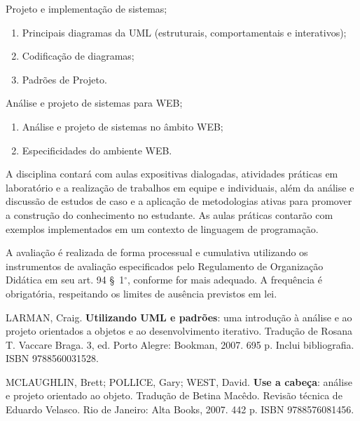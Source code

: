 \begin{pud}
\begin{description}[itemsep=0em]
		\item[UNIDADE III:] Projeto e implementação de sistemas; 
	         \begin{enumerate}[itemsep=0em, topsep=0em]
				\item Principais diagramas da UML (estruturais, comportamentais  e interativos);
				\item Codificação de diagramas;
				\item Padrões de Projeto.
            \end{enumerate}
            
        \item[UNIDADE IV:] Análise e projeto de sistemas para WEB;
	         \begin{enumerate}[itemsep=0em, topsep=0em]
				\item Análise e projeto de sistemas no âmbito WEB;
				\item Especificidades do ambiente WEB.
            \end{enumerate}

                                    

	\end{description}
	
	
	\metodologia
	A disciplina contará com aulas expositivas dialogadas, atividades práticas em laboratório e a realização de trabalhos em equipe e individuais, além da análise e discussão de estudos de caso e a aplicação de metodologias ativas para promover a construção do conhecimento no estudante. As aulas práticas contarão com exemplos implementados em um contexto de linguagem de programação.
	
	\avaliacao
	A avaliação é realizada de forma processual e cumulativa utilizando os instrumentos de avaliação especificados pelo Regulamento de Organização Didática em seu art. 94 \S~1$^\circ$, conforme for mais adequado. A frequência é obrigatória, respeitando os limites de ausência previstos em lei.
	\naopresencial
	
	
	\begin{bibbasica}
		 \item LARMAN, Craig. \textbf{Utilizando UML e padrões}: uma introdução à análise e ao projeto orientados a objetos e ao desenvolvimento iterativo. Tradução de Rosana T. Vaccare Braga. 3, ed. Porto Alegre: Bookman, 2007. 695 p. Inclui bibliografia. ISBN 9788560031528.
		\item MCLAUGHLIN, Brett; POLLICE, Gary; WEST, David. \textbf{Use a cabeça}: análise e projeto orientado ao objeto. Tradução de Betina Macêdo. Revisão técnica de Eduardo Velasco. Rio de Janeiro: Alta Books, 2007. 442 p. ISBN 9788576081456.
        

\end{bibbasica}
\end{pud}
